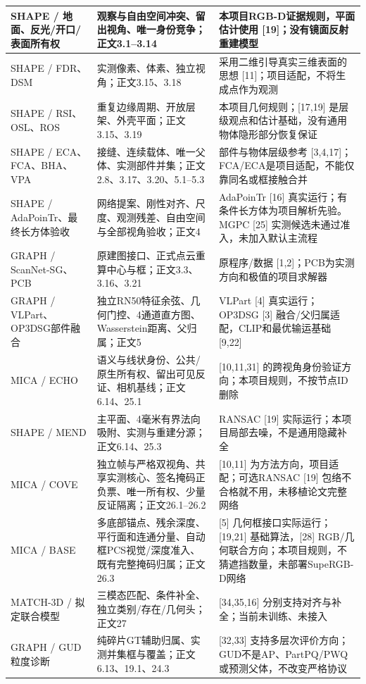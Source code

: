 \documentclass[UTF8,fontset=fandol]{ctexart}
\begin{document}
{\begin{longtable}{|p{}|p{}|p{}|}
SHAPE / 地面、反光/开口/表面所有权 & 观察与自由空间冲突、留出视角、唯一身份竞争；正文3.1–3.14 & 本项目RGB-D证据规则，平面估计使用 [19]；没有镜面反射重建模型 \\ \hline
SHAPE / FDR、DSM & 实测像素、体素、独立视角；正文3.15、3.18 & 采用二维引导真实三维表面的思想 [11]；项目适配，不将生成点作为观测 \\ \hline
SHAPE / RSI、OSL、ROS & 重复边缘周期、开放层架、外壳平面；正文3.15、3.19 & 本项目几何规则；[17,19] 是层级观点和估计基础，没有通用物体隐形部分恢复保证 \\ \hline
SHAPE / ECA、FCA、BHA、VPA & 接缝、连续载体、唯一父体、实测部件并集；正文2.8、3.17、3.20、5.1–5.3 & 部件与物体层级参考 [3,4,17]；FCA/ECA是项目适配，不能仅靠同名或框接触合并 \\ \hline
SHAPE / AdaPoinTr、最终长方体验收 & 网络提案、刚性对齐、尺度、观测残差、自由空间与全部视角验收；正文4 & AdaPoinTr [16] 真实运行；有条件长方体为项目解析先验。MGPC [25] 实测候选未通过准入，未加入默认主流程 \\ \hline
GRAPH / ScanNet-SG、PCB & 原建图接口、正式点云重算中心与框；正文3.3、3.16、3.21 & 原程序/数据 [1,2]；PCB为实测方向和极值的项目求解器 \\ \hline
GRAPH / VLPart、OP3DSG部件融合 & 独立RN50特征余弦、几何门控、4通道直方图、Wasserstein距离、父归属；正文5 & VLPart [4] 真实运行；OP3DSG [3] 融合/父归属适配，CLIP和最优输运基础 [9,22] \\ \hline
MICA / ECHO & 语义与线状身份、公共/原生所有权、留出可见反证、相机基线；正文6.14、25.1 & [10,11,31] 的跨视角身份验证方向；本项目规则，不按节点ID删除 \\ \hline
SHAPE / MEND & 主平面、4毫米有界法向吸附、实测与重建分源；正文6.14、25.3 & RANSAC [19] 实际运行；本项目局部去噪，不是通用隐藏补全 \\ \hline
MICA / COVE & 独立帧与严格双视角、共享实测核心、签名掩码正负票、唯一所有权、少量反证隔离；正文26.1–26.2 & [10,11] 为方法方向，项目适配；可选RANSAC [19] 包络不合格就不用，未移植论文完整网络 \\ \hline
MICA / BASE & 多底部锚点、残余深度、平行面和连通分量、自动框PCS视觉/深度准入、既有完整掩码归属；正文26.3 & [5] 几何框接口实际运行；[19,21] 基础算法，[28] RGB/几何联合方向；本项目规则，不猜遮挡数量，未部署SupeRGB-D网络 \\ \hline
MATCH-3D / 拟定联合模型 & 三模态匹配、条件补全、独立类别/存在/几何头；正文27 & [34,35,16] 分别支持对齐与补全；当前未训练、未接入 \\ \hline
GRAPH / GUD粒度诊断 & 纯碎片GT辅助归属、实测并集框与覆盖；正文6.13、19.1、24.3 & [32,33] 支持多层次评价方向；GUD不是AP、PartPQ/PWQ或预测父体，不改变严格协议 \\ \hline

\end{longtable}}
\end{document}

